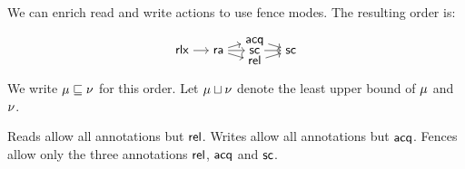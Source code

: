 We can enrich read and write actions to use fence modes.
The resulting order is:
\begin{displaymath}
  \begin{tikzpicture}
    \node (rlx) at (0, 0) {$\mathstrut\mRLX$};
    \node (ra)  at (1, 0) {$\mathstrut\mRA$};
    \node (sc)  at (2, 0) {$\mathstrut\mSC$};
    \node (fsc) at (3, 0) {$\mathstrut\fSC$};
    \node (rel) at (2, -0.3) {$\mathstrut\fREL$};
    \node (acq) at (2,  0.3) {$\mathstrut\fACQ$};
    \draw[->](rlx)to(ra);
    \draw[->](ra)to(sc);
    \draw[->](ra)to(rel);
    \draw[->](ra)to(acq);
    \draw[->](sc)to(fsc);
    \draw[->](rel)to(fsc);
    \draw[->](acq)to(fsc);
  \end{tikzpicture}
\end{displaymath}
We write $\mu\sqsubseteq\nu$ for this order.
Let $\mu\sqcup\nu$ denote the least upper bound of $\mu$ and $\nu$.

Reads allow all annotations but ${\mathsf{rel}}$.  Writes allow all annotations but
${\mathsf{acq}}$.  Fences allow only the three annotations ${\mathsf{rel}}$, ${\mathsf{acq}}$ and
${\mathsf{sc}}$.


